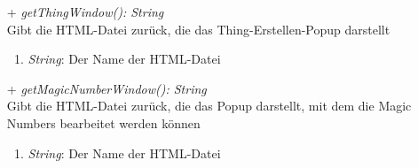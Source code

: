 \begin{itemize}
	\item[+] \textit{ getThingWindow(): String } \\
	Gibt die HTML-Datei zurück, die das Thing-Erstellen-Popup darstellt
	\begin{enumerate}[$\circ$]
		\item \textit{String}: Der Name der HTML-Datei
	\end{enumerate}

	\item[+] \textit{ getMagicNumberWindow(): String } \\
	Gibt die HTML-Datei zurück, die das Popup darstellt, mit dem die Magic Numbers bearbeitet werden können
	\begin{enumerate}[$\circ$]
		\item \textit{String}: Der Name der HTML-Datei
	\end{enumerate}
\end{itemize}